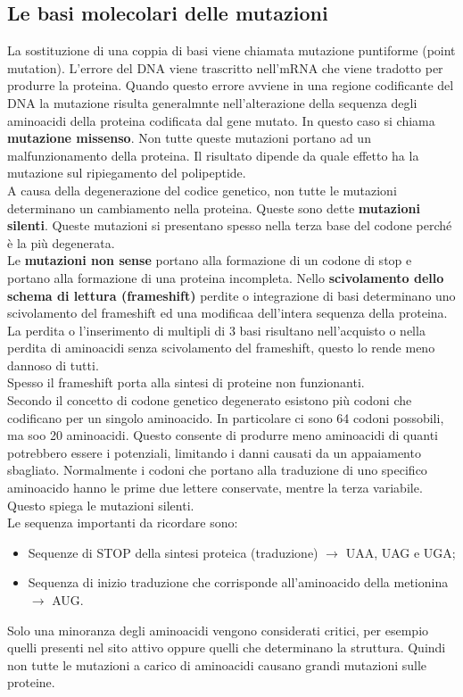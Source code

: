 \subsection{Le basi molecolari delle mutazioni}
La sostituzione di una coppia di basi viene chiamata mutazione puntiforme (point mutation). L'errore del DNA viene trascritto nell'mRNA che viene tradotto per produrre la proteina. Quando questo errore avviene in una regione codificante del DNA la mutazione risulta generalmnte nell'alterazione della sequenza degli aminoacidi della proteina codificata dal gene mutato. In questo caso si chiama \textbf{mutazione missenso}. Non tutte queste mutazioni portano ad un malfunzionamento della proteina. Il risultato dipende da quale effetto ha la mutazione sul ripiegamento del polipeptide. 
\\A causa della degenerazione del codice genetico, non tutte le mutazioni determinano un cambiamento nella proteina. Queste sono dette \textbf{mutazioni silenti}. Queste mutazioni si presentano spesso nella terza base del codone perché è la più degenerata.
\\Le \textbf{mutazioni non sense} portano alla formazione di un codone di stop e portano alla formazione di una proteina incompleta. 
Nello \textbf{scivolamento dello schema di lettura (frameshift)} perdite o integrazione di basi determinano uno scivolamento del frameshift ed una modificaa dell'intera sequenza della proteina. La perdita o l'inserimento di multipli di 3 basi risultano nell'acquisto o nella perdita di aminoacidi senza scivolamento del frameshift, questo lo rende meno dannoso di tutti. 
\\Spesso il frameshift porta alla sintesi di proteine non funzionanti. 
\\Secondo il concetto di codone genetico degenerato esistono più codoni che codificano per un singolo aminoacido. In particolare ci sono 64 codoni possobili, ma soo 20 aminoacidi. Questo consente di produrre meno aminoacidi di quanti potrebbero essere i potenziali, limitando i danni causati da un appaiamento sbagliato. Normalmente i codoni che portano alla traduzione di uno specifico aminoacido hanno le prime due lettere conservate, mentre la terza variabile. Questo spiega le mutazioni silenti.
\\Le sequenza importanti da ricordare sono:
\begin{itemize}
    \item Sequenze di STOP della sintesi proteica (traduzione) $\xrightarrow{}$ UAA, UAG e UGA; 
    \item Sequenza di inizio traduzione che corrisponde all'aminoacido della metionina $\xrightarrow{}$ AUG.
\end{itemize}
Solo una minoranza degli aminoacidi vengono considerati critici, per esempio quelli presenti nel sito attivo oppure quelli che determinano la struttura. Quindi non tutte le mutazioni a carico di aminoacidi causano grandi mutazioni sulle proteine. 
